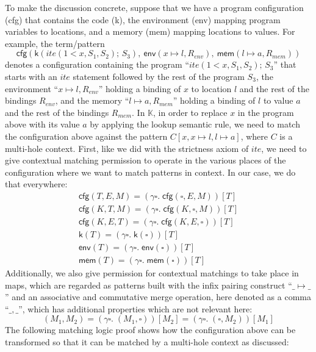 \documentclass[acmsmall,review,anonymous]{acmart}
\newcommand{\K}{$\mathbb{K}$\xspace}
\newcommand{\hole}{\square}
\newcommand{\ite}{\textit{ite}}
\begin{document}
To make the discussion concrete, suppose that we have a program configuration
(\textsf{cfg}) that contains the code (\textsf{k}), the environment
(\textsf{env}) mapping program variables to locations,
and a memory (\textsf{mem}) mapping locations to values.
For example, the term/pattern
$$
\textsf{cfg}
(
\textsf{k}(\ite(1 < x,S_1,S_2)\textsf{;\ }S_3),
\ \textsf{env}(x \mapsto l, R_\textit{env})
,
\ \textsf{mem}(l \mapsto a, R_\textit{mem})
)
$$
denotes a configuration containing the program
``$\ite(1 < x,S_1,S_2)\textsf{;\ }S_3$''
that starts with an $\ite$ statement followed by the rest of the program $S_3$,
the environment ``$x \mapsto l, R_\textit{env}$'' holding a binding
of $x$ to location $l$ and the rest of the bindings $R_\textit{env}$,
and the memory ``$l \mapsto a, R_\textit{mem}$'' holding a binding
of $l$ to value $a$ and the rest of the bindings $R_\textit{mem}$.
In \K, in order to replace $x$ in the program above with its value $a$ by
applying the lookup semantic rule, we need to match the configuration above
against the pattern $C[x,x\mapsto l,l\mapsto a]$, where $C$ is a multi-hole
context.
First, like we did with the strictness axiom of $\ite$, we need to give
contextual matching permission to operate in the various places of the
configuration where we want to match patterns in context.
In our case, we do that everywhere:
$$
\begin{array}{l}
\textsf{cfg}(T,E,M) = (\gamma\hole.\;\textsf{cfg}(\hole,E,M))[T]
\\
\textsf{cfg}(K,T,M) = (\gamma\hole.\;\textsf{cfg}(K,\hole,M))[T]
\\
\textsf{cfg}(K,E,T) = (\gamma\hole.\;\textsf{cfg}(K,E,\hole))[T]
\\
\textsf{k}(T) = (\gamma\hole.\;\textsf{k}(\hole))[T]
\\
\textsf{env}(T) = (\gamma\hole.\;\textsf{env}(\hole))[T]
\\
\textsf{mem}(T) = (\gamma\hole.\;\textsf{mem}(\hole))[T]
\end{array}
$$
Additionally, we also give permission for contextual matchings to
take place in maps, which are regarded as patterns built with
the infix pairing construct ``$\_\mapsto\_$'' and an associative and
commutative merge operation, here denoted as a comma ``$\_,\_$'', which
has additional properties which are not relevant here:
$$
(M_1,M_2) 
= (\gamma\hole.\;(M_1,\hole))[M_2]
= (\gamma\hole.\;(\hole,M_2))[M_1]
$$
The following matching logic proof shows how the configuration above
can be transformed so that it can be matched by a multi-hole context
as discussed:
\end{document}
